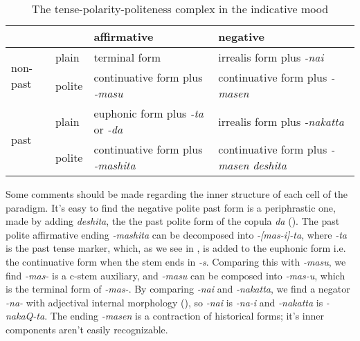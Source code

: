 \documentclass[UTF8, a4paper, oneside, scheme=plain]{ctexrep}
\newcommand{\corpus}[1]{\emph{#1}}
\begin{document}
\begin{table}[H]
    \caption{The tense-polarity-politeness complex in the indicative mood}
    \label{tbl:tense-polarity-politeness}
    \begin{tabular}{llll}
        \toprule
        &                            & affirmative                                                       & negative                                                          \\
                              \midrule
    \multirow{2}{*}{non-past} & plain                      & terminal form                                                     & irrealis form plus \corpus{-nai}                                   \\
                              & polite                     & continuative form plus \corpus{-masu}                              & continuative form plus \corpus{-masen}                             \\ \midrule
    \multirow{2}{*}{past}     & \multicolumn{1}{l}{plain}  & \multicolumn{1}{l}{euphonic form plus \corpus{-ta} or \corpus{-da}} & \multicolumn{1}{l}{irrealis form plus \corpus{-nakatta}}           \\
                              & \multicolumn{1}{l}{polite} & \multicolumn{1}{l}{continuative form plus \corpus{-mashita}}       & \multicolumn{1}{l}{continuative form plus \corpus{-masen deshita}} \\
                              \bottomrule
    \end{tabular}
\end{table}

Some comments should be made regarding the inner structure of each cell of the paradigm.
It's easy to find the negative polite past form is a periphrastic one,
made by adding \corpus{deshita}, the the past polite form of the copula \corpus{da} 
().
The past polite affirmative ending \corpus{-mashita} can be decomposed into 
\corpus{-[mas-i]-ta},
where \corpus{-ta} is the past tense marker,
which, as we see in ,
is added to the euphonic form i.e. the continuative form when the stem ends in \corpus{-s}.
Comparing this with \corpus{-masu},
we find \corpus{-mas-} is a c-stem auxiliary,
and \corpus{-masu} can be composed into \corpus{-mas-u},
which is the terminal form of \corpus{-mas-}.
By comparing \corpus{-nai} and \corpus{-nakatta},
we find a negator \corpus{-na-} with adjectival internal morphology (),
so \corpus{-nai} is \corpus{-na-i} and \corpus{-nakatta} is \corpus{-nakaQ-ta}.
The ending \corpus{-masen} is a contraction of historical forms;
it's inner components aren't easily recognizable.
\end{document}
